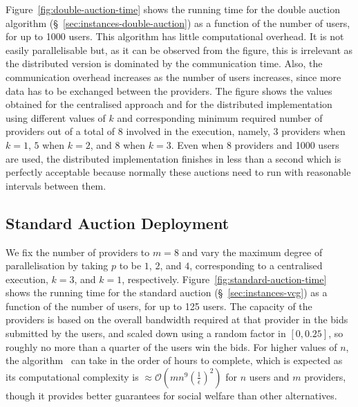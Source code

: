 Figure~\ref{fig:double-auction-time} shows the running time for the double auction algorithm (\S~\ref{sec:instances-double-auction}) as a function of the number of users, for up to 1000 users. 
This algorithm has little computational overhead. 
It is not easily parallelisable but, as it can be observed from the figure, this is irrelevant as the distributed version is dominated by the communication time. 
Also, the communication overhead increases as the number of users increases, since more data has to be exchanged between the providers. 
The figure shows the values obtained for the centralised approach and for the distributed implementation using different values of $k$
and corresponding minimum required number of providers out of a total of 8 involved in the execution, namely, $3$ providers when $k=1$, $5$ when $k=2$, and $8$ when $k=3$. 
Even when 8 providers and 1000 users are used, the 
distributed implementation finishes in less than a second which is perfectly 
acceptable because normally these auctions need to run with reasonable intervals between them.

\subsection{Standard Auction Deployment}

We fix the number of providers to $m=8$ and vary the maximum degree of parallelisation 
by taking $p$ to be $1$, $2$, and $4$, corresponding to a centralised execution, $k=3$, and $k=1$, respectively.
Figure~\ref{fig:standard-auction-time} shows the running time for the standard 
auction (\S~\ref{sec:instances-vcg}) as a function of the number of users, for up to 125 users.
The capacity of the providers is based on the overall bandwidth required at that provider in the bids submitted by the users, and scaled down using a random factor in $[0, 0.25]$, so roughly no more than a quarter of the users win the bids. 
For higher values of $n$, the algorithm~\cite{Zhang2015Truthful} can take in the order of hours to complete, 
which is expected as its computational complexity is $\approx \mathcal{O}(mn^9(\frac{1}{\epsilon})^2)$ for $n$ users and $m$ providers, though it provides better guarantees for social welfare than other alternatives.

